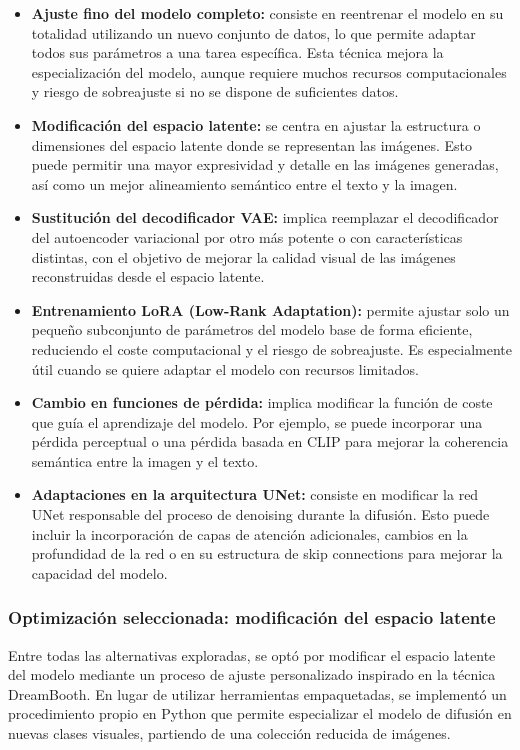 \begin{itemize}
    \item \textbf{Ajuste fino del modelo completo:} consiste en reentrenar el modelo en su totalidad utilizando un nuevo conjunto de datos, lo que permite adaptar todos sus parámetros a una tarea específica. Esta técnica mejora la especialización del modelo, aunque requiere muchos recursos computacionales y riesgo de sobreajuste si no se dispone de suficientes datos.

    \item \textbf{Modificación del espacio latente:} se centra en ajustar la estructura o dimensiones del espacio latente donde se representan las imágenes. Esto puede permitir una mayor expresividad y detalle en las imágenes generadas, así como un mejor alineamiento semántico entre el texto y la imagen.

    \item \textbf{Sustitución del decodificador VAE:} implica reemplazar el decodificador del autoencoder variacional por otro más potente o con características distintas, con el objetivo de mejorar la calidad visual de las imágenes reconstruidas desde el espacio latente.

    \item \textbf{Entrenamiento LoRA (Low-Rank Adaptation):} permite ajustar solo un pequeño subconjunto de parámetros del modelo base de forma eficiente, reduciendo el coste computacional y el riesgo de sobreajuste. Es especialmente útil cuando se quiere adaptar el modelo con recursos limitados.

    \item \textbf{Cambio en funciones de pérdida:} implica modificar la función de coste que guía el aprendizaje del modelo. Por ejemplo, se puede incorporar una pérdida perceptual o una pérdida basada en CLIP para mejorar la coherencia semántica entre la imagen y el texto.

    \item \textbf{Adaptaciones en la arquitectura UNet:} consiste en modificar la red UNet responsable del proceso de denoising durante la difusión. Esto puede incluir la incorporación de capas de atención adicionales, cambios en la profundidad de la red o en su estructura de skip connections para mejorar la capacidad del modelo.
\end{itemize}

\subsubsection{Optimización seleccionada: modificación del espacio latente}
Entre todas las alternativas exploradas, se optó por modificar el espacio latente del modelo mediante un proceso de ajuste personalizado inspirado en la técnica DreamBooth. En lugar de utilizar herramientas empaquetadas, se implementó un procedimiento propio en Python que permite especializar el modelo de difusión en nuevas clases visuales, partiendo de una colección reducida de imágenes.

